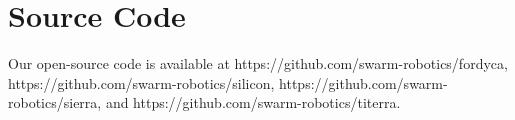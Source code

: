 
\section{Source Code}\label{sec:exp-source-code}


Our open-source code is available at https://github.com/swarm-robotics/fordyca,
https://github.com/swarm-robotics/silicon,
https://github.com/swarm-robotics/sierra, and
https://github.com/swarm-robotics/titerra.

